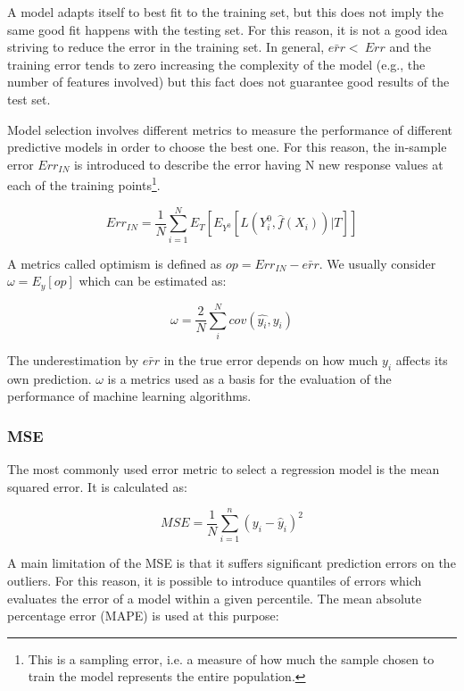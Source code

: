 A model adapts itself to best fit to the training set, but this does not imply the same good fit happens with the testing set. For this reason, it is not a good idea striving to reduce the error in the training set. In general, $\bar{err}<\ Err$ and the training error tends to zero increasing the complexity of the model (e.g., the number of features involved) but this fact does not guarantee good results of the test set.\par

Model selection involves different metrics to measure the performance of different predictive models in order to choose the best one. For this reason, the in-sample error $Err_{IN}$ is introduced to describe the error having N new response values at each of the training points\footnote{This is a sampling error, i.e. a measure of how much the sample chosen to train the model represents the entire population.}.

\begin{equation}
Err_{IN}= \frac{1}{N}\sum_{i=1}^{N}E_{T}\left[E_{Y^0}\left[L\left(Y_i^0,\hat{f}(X_i)\right)|T\right]\right]
\label{eq_trainTestError3}
\end{equation}

A metrics called optimism is defined as $op=Err_{IN}-\bar{err}$. We usually consider $\omega=E_y[op]$ which can be estimated as:

\begin{equation}
\omega=\frac{2}{N}\sum_{i}^{N}{cov(\widehat{y_i},y_i)}
\label{eq_trainTestError4}
\end{equation}

The underestimation by $\bar{err}$ in the true error depends on how much $y_i$ affects its own prediction. $\omega$ is a metrics used as a basis for the evaluation of the performance of machine learning algorithms.

\subsubsection{MSE} \label{secMSE}
The most commonly used error metric to select a regression model is the mean squared error. It is calculated as:

\begin{equation}
MSE=\frac{1}{N}\sum_{i=1}^{n}\left(y_i-{\hat{y}}_i\right)^2
\label{eq_MSE}
\end{equation}

A main limitation of the MSE is that it suffers significant prediction errors on the outliers. For this reason, it is possible to introduce quantiles of errors which evaluates the error of a model within a given percentile. The mean absolute percentage error (MAPE) is used at this purpose:

